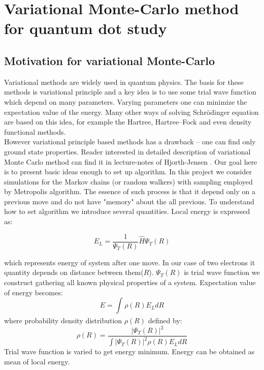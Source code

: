 \documentclass[10pt]{article}
\begin{document}
\newpage
\section{Variational Monte-Carlo method for quantum dot study}\label{Part1}
\subsection{Motivation for variational Monte-Carlo}
Variational methods are widely used in quantum physics. The basis for these methods is variational principle and a key idea is to use some trial wave function which depend on many parameters. Varying parameters one can minimize the expectation value of the energy. Many other ways of solving Schr\"{o}dinger equation are based on this idea, for example the Hartree, Hartree–Fock and even density functional methods.\\
However variational principle based methods has a drawback -- one can find only ground state properties. Reader interested in detailed description of
variational Monte Carlo method can find it in lecture-notes of Hjorth-Jensen \cite{one}. Our goal here is to present basic ideas enough to set up algorithm.
In this project we consider simulations for the Markov chains (or random walkers) with sampling employed by Metropolis algorithm. The essence of such process is that it depend only on a previous move and do not have "memory" about the all previous.
To understand how to set algorithm we introduce several quantities. Local energy is expressed as:

\begin{equation*}
E_L = \frac{1}{\Psi_T(R)} \hat{H} \Psi_T(R)
\end{equation*}

which represents energy of system after one move. In our case of two electrons it quantity depends on distance between them($R$).
$\Psi_T(R)$ is trial wave function we construct gathering all known physical properties of a system.
Expectation value of energy becomes:
\begin{equation*}
E = \int_{}^{} \rho(R)E_L dR
\end{equation*}
where probability density distribution $\rho(R)$ defined by:
\begin{equation*}
\rho(R) = \frac{|\Psi_T(R)|^2}{\int |\Psi_T(R)|^2\rho(R)E_L dR}
\end{equation*}
Trial wave function is varied to get energy minimum. Energy can be obtained as mean of local energy.
\end{document}
